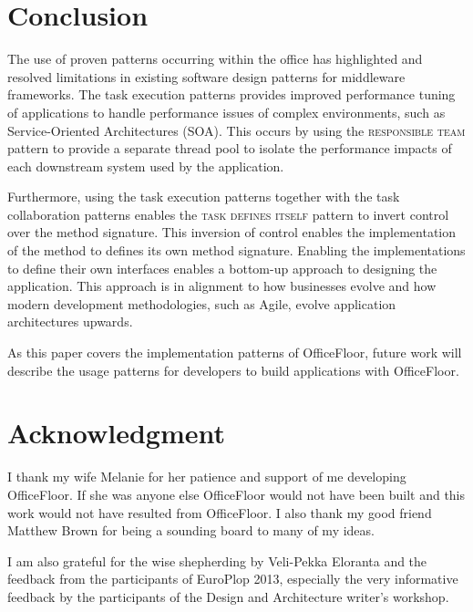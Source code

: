 \documentclass[prodmode]{style/acmlarge}
\begin{document}
\section{Conclusion}

The use of proven patterns occurring within the office has highlighted and
resolved limitations in existing software design patterns for middleware
frameworks.  The task execution patterns provides improved performance tuning of
applications to handle performance issues of complex environments, such as
Service-Oriented Architectures (SOA).  This occurs by using the
\textsc{responsible team} pattern to provide a separate thread pool to isolate
the performance impacts of each downstream system used by the application.

Furthermore, using the task execution patterns together with the task
collaboration patterns enables the \textsc{task defines itself} pattern to
invert control over the method signature.  This inversion of control enables the
implementation of the method to defines its own method signature.  Enabling the
implementations to define their own interfaces enables a bottom-up approach to
designing the application.  This approach is in alignment to how businesses
evolve and how modern development methodologies, such as Agile, evolve
application architectures upwards.

As this paper covers the implementation patterns of OfficeFloor, future work
will describe the usage patterns for developers to build applications with
OfficeFloor.



\section*{Acknowledgment} 

I thank my wife Melanie for her patience and support of me developing
OfficeFloor.  If she was anyone else OfficeFloor would not have been built and
this work would not have resulted from OfficeFloor.  I also thank my good friend
Matthew Brown for being a sounding board to many of my ideas.

I am also grateful for the wise shepherding by Veli-Pekka Eloranta and the
feedback from the participants of EuroPlop 2013, especially the very informative
feedback by the participants of the Design and Architecture writer's workshop.




\end{document}
